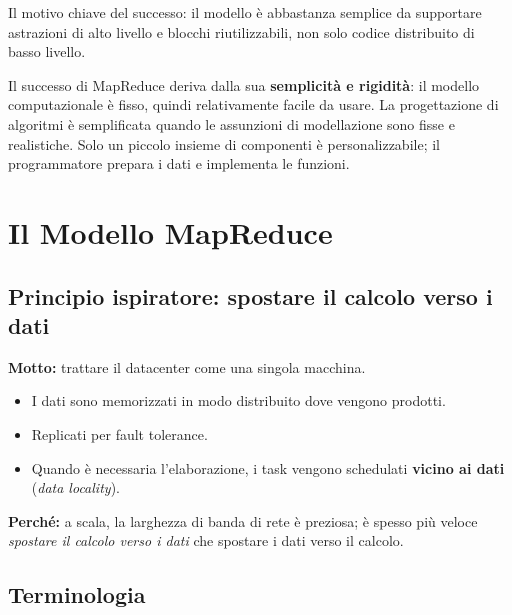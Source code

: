 \begin{takeaway}
  Il motivo chiave del successo: il modello è abbastanza semplice da supportare
  astrazioni di alto livello e blocchi riutilizzabili, non solo codice distribuito
  di basso livello.
\end{takeaway}

Il successo di MapReduce deriva dalla sua \textbf{semplicità e rigidità}:
il modello computazionale è fisso, quindi relativamente facile da usare.
La progettazione di algoritmi è semplificata quando le assunzioni di modellazione
sono fisse e realistiche. Solo un piccolo insieme di componenti è personalizzabile;
il programmatore prepara i dati e implementa le funzioni.

\newpage
\section{Il Modello MapReduce}

\subsection{Principio ispiratore: spostare il calcolo verso i dati}

\begin{importante}
  \textbf{Motto:} trattare il datacenter come una singola macchina.
  \begin{itemize}
    \item I dati sono memorizzati in modo distribuito dove vengono prodotti.
    \item Replicati per fault tolerance.
    \item Quando è necessaria l'elaborazione, i task vengono schedulati
      \textbf{vicino ai dati} (\emph{data locality}).
  \end{itemize}
  \textbf{Perché:} a scala, la larghezza di banda di rete è preziosa; è spesso
  più veloce \emph{spostare il calcolo verso i dati} che spostare i dati verso
  il calcolo.
\end{importante}

\subsection{Terminologia}

